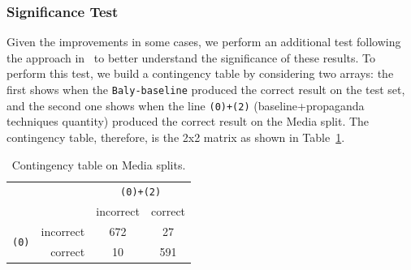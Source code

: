
\subsubsection{Significance Test}

Given the improvements in some cases, we perform an additional test following the approach in~\citet{mcnemar1947note}
to better understand the significance of these results. %
To perform this test, we build a contingency table by considering two arrays: the first shows when the \texttt{Baly-baseline} produced the correct result on the test set, and the second one shows when the line \texttt{(0)+(2)} (baseline+propaganda techniques quantity) produced the correct result on the Media split. The contingency table, therefore, is the 2x2 matrix as shown in
Table~\ref{tab:contingency2}.


\begin{table}[!htbp]
    \centering
    \small
    \begin{tabular}{rr|c|c}
                                      &           & \multicolumn{2}{c}{\texttt{(0)+(2)}}           \\
                                      &           & incorrect                            & correct \\
        \hline
        \multirow{2}{*}{\texttt{(0)}} & incorrect & 672                                  & 27      \\
                                      & correct   & 10                                   & 591
    \end{tabular}
    \caption{Contingency table on Media splits.}
    \label{tab:contingency2}
\end{table}


